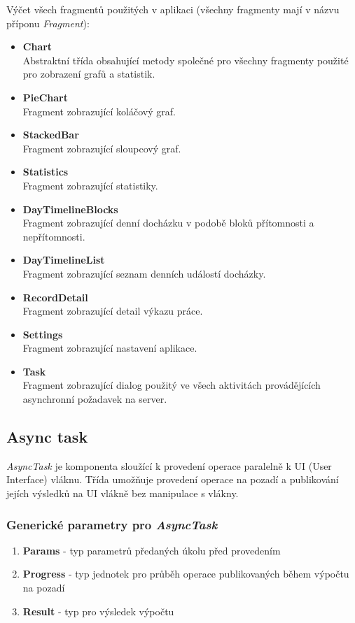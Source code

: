 \documentclass{diplomka}
\begin{document}
Výčet všech fragmentů použitých v aplikaci (všechny fragmenty mají v názvu příponu \emph{Fragment}):
\begin{itemize}[noitemsep,nolistsep]
\item \textbf{Chart}\\
Abstraktní třída obsahující metody společné pro všechny fragmenty použité pro zobrazení grafů a statistik.
\item \textbf{PieChart}\\
Fragment zobrazující koláčový graf.
\item \textbf{StackedBar}\\
Fragment zobrazující sloupcový graf.
\item \textbf{Statistics}\\
Fragment zobrazující statistiky.
\item \textbf{DayTimelineBlocks}\\
Fragment zobrazující denní docházku v podobě bloků přítomnosti a nepřítomnosti.
\item \textbf{DayTimelineList}\\
Fragment zobrazující seznam denních událostí docházky.
\item \textbf{RecordDetail}\\
Fragment zobrazující detail výkazu práce.
\item \textbf{Settings}\\
Fragment zobrazující nastavení aplikace.
\item \textbf{Task}\\
Fragment zobrazující dialog použitý ve všech aktivitách provádějících asynchronní požadavek na server.
\end{itemize}

\subsection{Async task}
\label{sec:asynctask}
\emph{AsyncTask} je komponenta sloužící k provedení operace paralelně k UI (User Interface) vláknu. Třída umožňuje provedení operace na pozadí a publikování jejích výsledků na UI vlákně bez manipulace s vlákny. 
\subsubsection*{Generické parametry pro \emph{AsyncTask}}
\begin{enumerate}
\item \textbf{Params} - typ parametrů předaných úkolu před provedením
\item \textbf{Progress} - typ jednotek pro průběh operace publikovaných během výpočtu na pozadí
\item \textbf{Result} - typ pro výsledek výpočtu
\end{enumerate}
\end{document}
